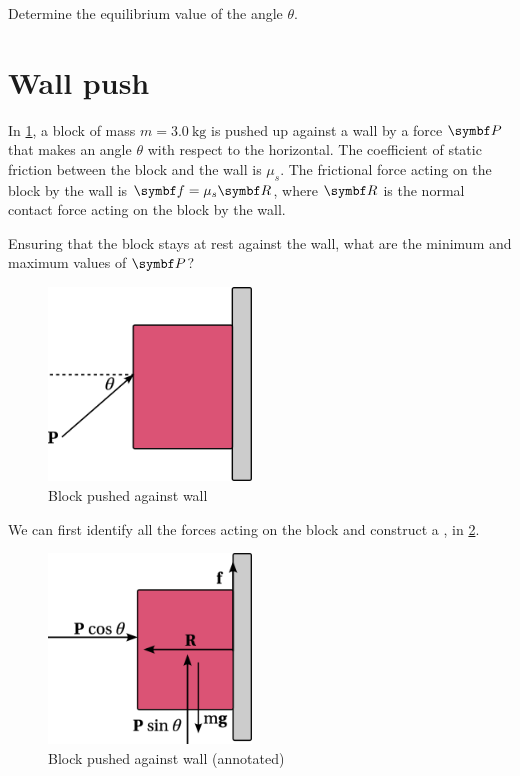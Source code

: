 \begin{problem}
  Determine the equilibrium value of the angle \(\theta\).
\end{problem}

\section{Wall push}
\begin{problem}
  In \cref{fig:wallpush}, a block of mass \(m = \qty{3.0}{\kg}\) is
  pushed up against a wall by a force
  \(\mv{P}\) that makes an angle \(\theta\) with respect to the horizontal.
  The coefficient of static friction between the block and the wall
  is \(\mu_s\).
  The frictional force acting on the block by the wall is \(\mv{f} =
  \mu_s\mv{R}\),
  where \(\mv{R}\) is the normal contact force acting on the block by the wall.

  Ensuring that the block stays at rest against the wall, what are the minimum
  and maximum values of \(\mv{P}\)?
\end{problem}
\begin{figure}
  \centering
  \includegraphics[width=0.48\textwidth]{assets/wallpush.png}
  \caption{Block pushed against wall}
  \label{fig:wallpush}
\end{figure}

We can first identify all the forces acting on the block and construct
a , in \cref{fig:wallpusha}.
\begin{figure}
  \centering
  \includegraphics[width=0.48\textwidth]{assets/wallpush-annotated.png}
  \caption{Block pushed against wall (annotated)}
  \label{fig:wallpusha}
\end{figure}

